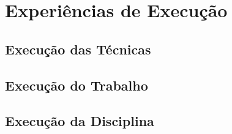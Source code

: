 \chapter[Experiências de Execução]{Experiências de Execução}

\section{Execução das Técnicas}

\section{Execução do Trabalho}

\section{Execução da Disciplina}